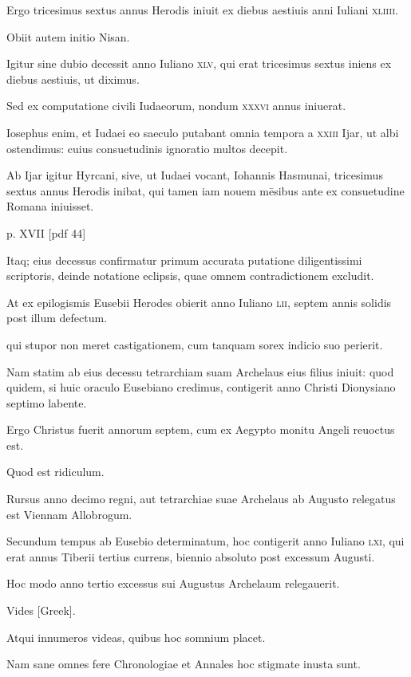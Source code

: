 \begin{parnumbers}
Ergo tricesimus sextus annus Herodis iniuit ex diebus aestiuis anni
Iuliani \textsc{xliiii}.

Obiit autem initio Nisan.

Igitur sine dubio decessit
anno Iuliano \textsc{xlv}, qui erat tricesimus sextus iniens ex diebus aestiuis,
ut diximus.

Sed ex computatione civili Iudaeorum, nondum
\textsc{xxxvi} annus iniuerat.

Iosephus enim, et Iudaei eo saeculo putabant
omnia tempora a \textsc{xxiii} Ijar, ut albi ostendimus: cuius consuetudinis
ignoratio multos decepit.

Ab Ijar igitur Hyrcani, sive, ut Iudaei
vocant, Iohannis Hasmunai, tricesimus sextus annus Herodis inibat,
qui tamen iam nouem mēsibus ante ex consuetudine Romana iniuisset.

\clearpage
p. XVII [pdf 44]

Itaq; eius decessus confirmatur primum accurata putatione
diligentissimi scriptoris, deinde notatione eclipsis, quae omnem contradictionem
excludit.

At ex epilogismis Eusebii Herodes obierit
anno Iuliano \textsc{lii}, septem annis solidis post illum defectum.

qui stupor non meret castigationem, cum tanquam sorex indicio suo perierit.

Nam statim ab eius decessu tetrarchiam suam Archelaus eius filius
iniuit: quod quidem, si huic oraculo Eusebiano credimus, contigerit
anno Christi Dionysiano septimo labente.

Ergo Christus fuerit
annorum septem, cum ex Aegypto monitu Angeli reuoctus est.

Quod est ridiculum.

Rursus anno decimo regni, aut tetrarchiae suae
Archelaus ab Augusto relegatus est Viennam Allobrogum.

Secundum tempus ab Eusebio determinatum, hoc contigerit anno Iuliano
\textsc{lxi}, qui erat annus Tiberii tertius currens, biennio absoluto
post excessum Augusti.

Hoc modo anno tertio excessus sui Augustus
Archelaum relegauerit.

Vides \textgreek{[Greek]}.

Atqui innumeros videas,
quibus hoc somnium placet.

Nam sane omnes fere Chronologiae
et Annales hoc stigmate inusta sunt.


\end{parnumbers}
